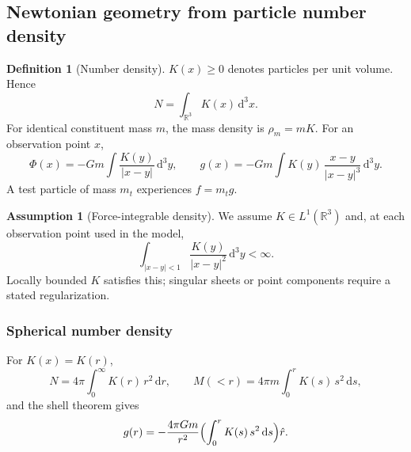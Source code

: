 \documentclass[11pt]{article}
\theoremstyle{definition}
\newtheorem{definition}[theorem]{Definition}
\newtheorem{assumption}[theorem]{Assumption}
\theoremstyle{remark}
\newcommand{\R}{\mathbb R}
\newcommand{\dd}{\mathrm{d}}
\begin{document}
\subsection{Newtonian geometry from particle number density}

\begin{definition}[Number density]
$K(x)\ge 0$ denotes particles per unit volume. Hence
\begin{equation}
  N=\int_{\R^3} K(x)\,\dd^3x.
\end{equation}
For identical constituent mass $m$, the mass density is $\rho_m=mK$.
For an observation point $x$,
\begin{equation}
  \Phi(x)=-Gm\int\frac{K(y)}{\lvert x-y\rvert}\,\dd^3y,\qquad
  g(x)=-Gm\int K(y)\,\frac{x-y}{\lvert x-y\rvert^3}\,\dd^3y.
\end{equation}
A test particle of mass $m_t$ experiences $f=m_t g$.
\end{definition}

\begin{assumption}[Force-integrable density]
We assume $K\in L^1(\R^3)$ and, at each observation point used in the model,
\begin{equation}
  \int_{\lvert x-y\rvert<1}\frac{K(y)}{\lvert x-y\rvert^2}\,\dd^3y<\infty.
\end{equation}
Locally bounded $K$ satisfies this; singular sheets or point components require a stated regularization.
\end{assumption}

\subsubsection{Spherical number density}
For $K(x)=K(r)$,
\begin{equation}
  N=4\pi\int_0^\infty K(r)\,r^2\,\dd r,\qquad
  M(<r)=4\pi m\int_0^r K(s)\,s^2\,\dd s,
\end{equation}
and the shell theorem gives
\begin{equation}
  g(r)=-\frac{4\pi G m}{r^2}\Bigl(\int_0^r K(s)\,s^2\,\dd s\Bigr)\hat r.
\end{equation}
\end{document}

